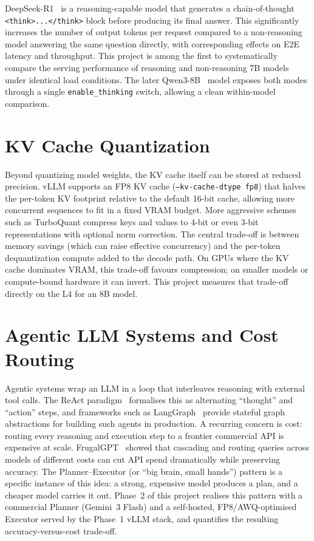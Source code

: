 \documentclass[a4paper,12pt]{report}
\begin{document}
DeepSeek-R1~\cite{deepseek} is a reasoning-capable model that generates a chain-of-thought \texttt{<think>...</think>} block before producing its final answer. This significantly increases the number of output tokens per request compared to a non-reasoning model answering the same question directly, with corresponding effects on E2E latency and throughput. This project is among the first to systematically compare the serving performance of reasoning and non-reasoning 7B models under identical load conditions. The later Qwen3-8B~\cite{qwen3} model exposes both modes through a single \texttt{enable\_thinking} switch, allowing a clean within-model comparison.

\section{KV Cache Quantization}

Beyond quantizing model weights, the KV cache itself can be stored at reduced precision. vLLM supports an FP8 KV cache (\texttt{--kv-cache-dtype fp8}) that halves the per-token KV footprint relative to the default 16-bit cache, allowing more concurrent sequences to fit in a fixed VRAM budget. More aggressive schemes such as TurboQuant compress keys and values to 4-bit or even 3-bit representations with optional norm correction. The central trade-off is between memory savings (which can raise effective concurrency) and the per-token dequantization compute added to the decode path. On GPUs where the KV cache dominates VRAM, this trade-off favours compression; on smaller models or compute-bound hardware it can invert. This project measures that trade-off directly on the L4 for an 8B model.

\section{Agentic LLM Systems and Cost Routing}

Agentic systems wrap an LLM in a loop that interleaves reasoning with external tool calls. The ReAct paradigm~\cite{react} formalises this as alternating ``thought'' and ``action'' steps, and frameworks such as LangGraph~\cite{langgraph} provide stateful graph abstractions for building such agents in production. A recurring concern is cost: routing every reasoning and execution step to a frontier commercial API is expensive at scale. FrugalGPT~\cite{frugalgpt} showed that cascading and routing queries across models of different costs can cut API spend dramatically while preserving accuracy. The Planner--Executor (or ``big brain, small hands'') pattern is a specific instance of this idea: a strong, expensive model produces a plan, and a cheaper model carries it out. Phase~2 of this project realises this pattern with a commercial Planner (Gemini~3 Flash) and a self-hosted, FP8/AWQ-optimised Executor served by the Phase~1 vLLM stack, and quantifies the resulting accuracy-versus-cost trade-off.
\end{document}
